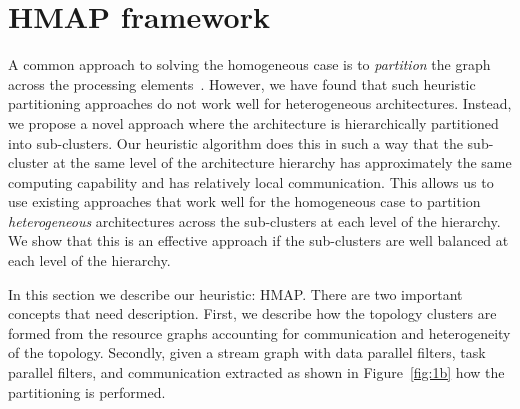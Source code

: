 \documentclass[10pt, conference, compsocconf, reqno]{IEEEtran}
\begin{document}

\section{HMAP framework}
\label{sec:our-framework}

A common approach to solving the homogeneous case is to
\textit{partition} the graph across the processing
elements~\cite{aale01,kpur99,enys98}.  However, we have found that such
heuristic partitioning approaches do not work well for heterogeneous
architectures. Instead, we propose a novel approach where the
architecture is hierarchically partitioned into sub-clusters.
Our heuristic algorithm does this in such a way that the
sub-cluster at the same level of the architecture hierarchy has
approximately the same computing capability and has relatively local
communication. This allows us to use existing approaches that work well
for the homogeneous case to partition \textit{heterogeneous}
architectures across the sub-clusters at each level of the hierarchy. We
show that this is an effective approach if the sub-clusters are well
balanced at each level of the hierarchy.

In this section we describe our heuristic: HMAP. There are two
important concepts that need description. First, we describe how the
topology clusters are formed from the resource graphs accounting for
communication and heterogeneity of the topology. Secondly, given a
stream graph with data parallel filters, task parallel filters, and
communication extracted as shown in Figure~\ref{fig:1b} how the partitioning
is performed.
\end{document}
